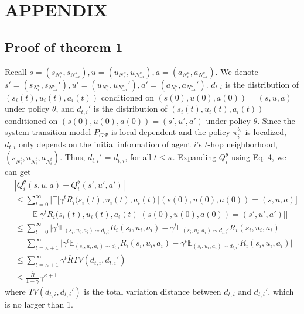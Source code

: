 \documentclass[conf]{new-aiaa}
\begin{document}


\newpage
\section{APPENDIX}

\subsection{Proof of theorem 1}

Recall $s = (s_{N_i^\kappa}, s_{N_{-i}^\kappa}), u = (u_{N_i^\kappa}, u_{N_{-i}^\kappa}), a = (a_{N_i^\kappa}, a_{N_{-i}^\kappa})$. We denote $s' = (s_{N_i^\kappa}, s_{N_{-i}^\kappa}'),u' = (u_{N_i^\kappa}, u_{N_{-i}^\kappa}'), a' = (a_{N_i^\kappa}, a_{N_{-i}^\kappa}')$. $d_{t, i}$ is the distribution of $(s_i(t), u_i(t), a_i(t))$ conditioned on $(s(0), u(0), a(0)) = (s, u, a)$ under policy $\theta$, and $d_{t, i}'$ is the distribution of $(s_i(t), u_i(t), a_i(t))$ conditioned on $(s(0), u(0), a(0)) = (s', u', a')$ under policy $\theta$. Since the system transition model $P_{G \mathcal{R}}$ is local dependent and the policy $\pi_i^{\theta_i}$ is localized, $d_{t, i}$ only depends on the initial information of agent $i$'s $t$-hop neighborhood, $(s_{N_i^t}, u_{N_i^t}, a_{N_i^t})$. Thus, $d_{t, i}'$ = $d_{t, i}$, for all $t \le \kappa$. Expanding  $Q_i^\theta$ using Eq. 4, we can get
\begin{equation}
    \begin{aligned}
        & |Q_i^\theta(s,u,a) - Q_i^\theta(s',u',a')| \\
        & \le \sum_{t=0}^\infty \Big |\mathbb{E}\big[\gamma^t R_i(s_i(t), u_i(t), a_i(t)|(s(0), u(0), a(0)) = (s,u, a)\big] \\
        & \quad - \mathbb{E}\big[\gamma^t R_i(s_i(t), u_i(t), a_i(t)|(s(0), u(0), a(0)) = (s', u', a')\big] \Big | \\
        & \le \sum_{t=0}^\infty \Big|\gamma^t \mathbb{E}_{(s_i, u_i, a_i) \sim d_{t,i}}R_i(s_i, u_i, a_i) - \gamma^t \mathbb{E}_{(s_i, u_i, a_i) \sim d_{t,i}'}R_i(s_i, u_i, a_i)\Big|\\
        &= \sum_{t=\kappa+1}^\infty \Big |\gamma^t \mathbb{E}_{(s_i, u_i, a_i) \sim d_{t,i}}R_i(s_i, u_i, a_i)  - \gamma^t \mathbb{E}_{(s_i, u_i, a_i) \sim d_{t,i}'}R_i(s_i, u_i, a_i)\Big| \\
        & \le \sum_{t=\kappa+1}^\infty \gamma^t \overline{R} TV(d_{t,i}, d_{t,i}') \\
        & \le \frac{\overline{R}}{1-\gamma} \gamma^{\kappa+1}
    \end{aligned} 
\end{equation}
where $TV(d_{t,i}, d_{t,i}')$ is the total variation distance between $d_{t,i}$ and $d_{t,i}'$, which is no larger than 1.
\end{document}
